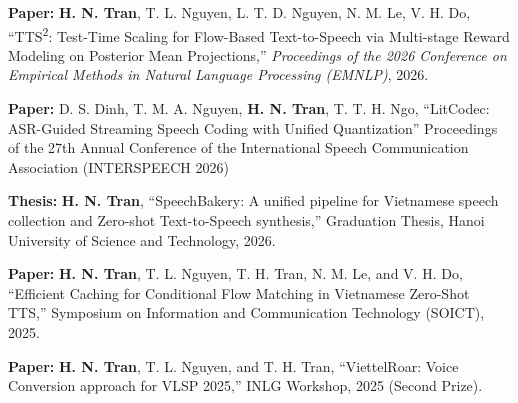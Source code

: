 

\begin{cvparagraph}

\textbf{Paper:} \textbf{H. N. Tran}, T. L. Nguyen, L. T. D. Nguyen, N. M. Le, V. H. Do,
``TTS\textsuperscript{2}: Test-Time Scaling for Flow-Based Text-to-Speech via Multi-stage Reward Modeling on Posterior Mean Projections,''
\textit{Proceedings of the 2026 Conference on Empirical Methods in Natural Language Processing (EMNLP)}, 2026.

\textbf{Paper:} D. S. Dinh, T. M. A. Nguyen, \textbf{H. N. Tran}, T. T. H. Ngo, “LitCodec: ASR-Guided Streaming Speech Coding with Unified Quantization” Proceedings of the 27th Annual Conference of the International Speech Communication Association (INTERSPEECH 2026)

\textbf{Thesis:} \textbf{H. N. Tran}, “SpeechBakery: A unified pipeline for Vietnamese speech collection and Zero-shot Text-to-Speech synthesis,” Graduation Thesis, Hanoi University of Science and Technology, 2026.

\textbf{Paper:} \textbf{H. N. Tran}, T. L. Nguyen, T. H. Tran, N. M. Le, and V. H. Do, “Efficient Caching for Conditional Flow Matching in Vietnamese Zero-Shot TTS,” Symposium on Information and Communication Technology (SOICT), 2025.

\textbf{Paper:} \textbf{H. N. Tran}, T. L. Nguyen, and T. H. Tran, “ViettelRoar: Voice Conversion approach for VLSP 2025,” INLG Workshop, 2025 (Second Prize).

\end{cvparagraph}

